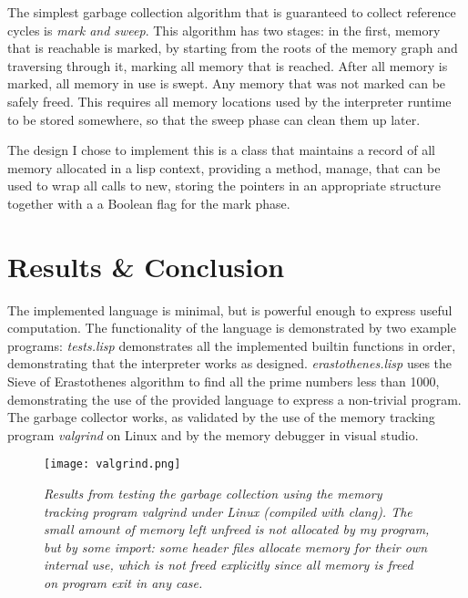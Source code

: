 \documentclass[12pt]{article}
\begin{document}

The simplest garbage collection algorithm that is guaranteed to
collect reference cycles is \textit{mark and sweep}. This algorithm
has two stages: in the first, memory that is reachable is marked, by
starting from the roots of the memory graph and traversing through it,
marking all memory that is reached. After all memory is marked, all
memory in use is swept. Any memory that was not marked can be safely
freed. This requires all memory locations used by the interpreter
runtime to be stored somewhere, so that the sweep phase can clean them
up later.

The design I chose to implement this is a class that maintains a
record of all memory allocated in a lisp context, providing a method,
manage, that can be used to wrap all calls to new, storing the
pointers in an appropriate structure together with a a Boolean flag
for the mark phase.

\section{Results \& Conclusion}


The implemented language is minimal, but is powerful enough to express
useful computation. The functionality of the language is demonstrated
by two example programs: \textit{tests.lisp} demonstrates all the
implemented builtin functions in order, demonstrating that the
interpreter works as designed. \textit{erastothenes.lisp} uses the
Sieve of Erastothenes algorithm to find all the prime numbers less
than 1000, demonstrating the use of the provided language to express a
non-trivial program. The garbage collector works, as validated by the
use of the memory tracking program \textit{valgrind} on Linux and by
the memory debugger in visual studio.


\begin{figure}
  \centering
  \texttt{[image: valgrind.png]}
  \caption{\textit{
  Results from testing the garbage collection using the memory tracking
  program valgrind under Linux (compiled with clang). The small amount 
  of memory left unfreed is not allocated by my program, but by some import:
  some header files allocate memory for their own internal use, which is 
  not freed explicitly since all memory is freed on program exit in any case.
  }}
\end{figure}
\end{document}
